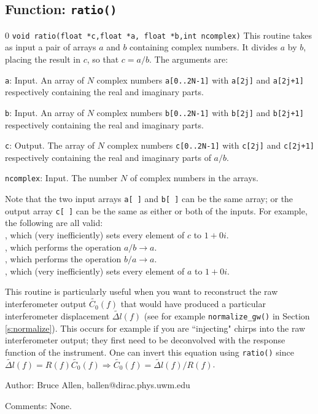 \subsection{Function: \tt ratio()}
\setcounter{equation}0
{\tt void ratio(float *c,float *a, float *b,int ncomplex)}
This routine takes as input a pair of arrays $a$ and $b$ containing
complex numbers.  It divides $a$ by $b$,
placing the result in $c$, so that $c = a /b$.
The arguments are:
\begin{description}
\item{\tt a}: Input.  An array of $N$ complex numbers {\tt a[0..2N-1]} with
  {\tt a[2j]} and {\tt a[2j+1]} respectively containing the real and
  imaginary parts.
\item{\tt b}: Input.  An array of $N$ complex numbers {\tt b[0..2N-1]} with
  {\tt b[2j]} and {\tt b[2j+1]} respectively containing the real and
  imaginary parts.
\item{\tt c}: Output.  The array of $N$ complex numbers {\tt c[0..2N-1]} with
  {\tt c[2j]} and {\tt c[2j+1]} respectively containing the real and
  imaginary parts of $a /b$.
\item{\tt ncomplex}: Input.   The number $N$ of complex numbers in the arrays.
\end{description}
Note that the two input arrays {\tt a[ ]} and {\tt b[ ]} can be the same
array; or the output array {\tt c[ ]} can be the same as either or both of
the inputs.  For example, the following are all valid:\\
, which (very inefficiently) sets every element of $c$ to $1+0i$. \\
, which performs the operation $a / b\rightarrow a$. \\
, which performs the operation $b/a \rightarrow a$. \\
, which (very inefficiently) sets every element of $a$ to $1+0i$.

This routine is particularly useful when you want to reconstruct the
raw interferometer output $\widetilde{C_0}(f)$ that would have produced
a particular interferometer displacement $\widetilde{\Delta l}(f)$ (see
for example {\tt normalize\_gw()} in Section \ref{s:normalize}).  This
occurs for example if you are ``injecting" chirps into the raw
interferometer output; they first need to be deconvolved with the
response function of the instrument.  One can invert this equation
using {\tt ratio()} since $\widetilde{\Delta l}(f) = R(f)
\widetilde{C_0}(f) \Rightarrow
\widetilde{C_0}(f) = \widetilde{\Delta l}(f)/R(f)$.
\begin{description}
\item{Author:}
Bruce Allen, ballen@dirac.phys.uwm.edu
\item{Comments:}
None.
\end{description}
\clearpage


